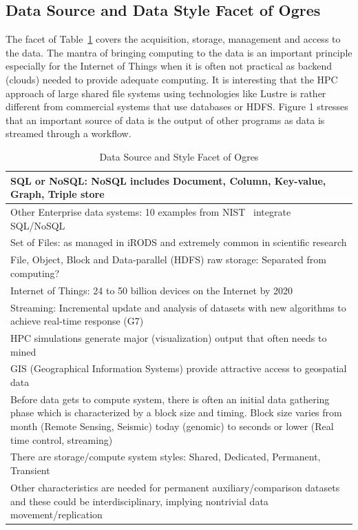 \documentclass{acm_proc_article-sp}
\begin{document}
\subsection{Data Source and Data Style Facet of Ogres}

The facet of Table~\ref{Table8} covers the acquisition, storage, management and
access to the data. The mantra of bringing computing to the data is an
important principle especially for the Internet of Things when it is often not
practical as backend (clouds) needed to provide adequate computing. It is
interesting that the HPC approach of large shared file systems using
technologies like Lustre is rather different from commercial systems that use
databases or HDFS. Figure 1 stresses that an important source of data is the
output of other programs as data is streamed through a workflow.

\begin{table}[H]
\centering
\caption{Data Source and Style Facet of Ogres}
\label{Table8}
\begin{tabular}{|p{8cm}|} \hline
SQL or NoSQL: NoSQL includes Document, Column, Key-value, Graph, Triple store \\ \hline
Other Enterprise data systems: 10 examples from NIST~\cite{bb} integrate SQL/NoSQL \\ \hline
Set of Files: as managed in iRODS and extremely common in scientific research \\ \hline
File, Object, Block and Data-parallel (HDFS) raw storage: Separated from computing? \\ \hline
Internet of Things: 24 to 50 billion devices on the Internet by 2020~\cite{b22,b11,b12} \\ \hline
Streaming: Incremental update and analysis of datasets with new algorithms to achieve real-time response (G7) \\ \hline
HPC simulations generate major (visualization) output that often needs to mined \\ \hline
GIS (Geographical Information Systems) provide attractive access to geospatial data \\ \hline
Before data gets to compute system, there is often an initial data gathering phase which is characterized by a block size and timing. Block size varies from month (Remote Sensing, Seismic) today (genomic) to seconds or lower (Real time control, streaming)\\ \hline
There are storage/compute system styles: Shared, Dedicated, Permanent, Transient \\ \hline
Other characteristics are needed for permanent auxiliary/comparison datasets and these could be interdisciplinary, implying nontrivial data movement/replication
\\ \hline
\end{tabular}
\end{table}
\end{document}
